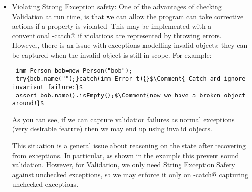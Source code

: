 \begin{itemize}
%
%

\item Violating Strong Exception safety:
One of the advantages of checking Validation at run time, is that
we can allow the program can take corrective actions if a property is violated.
This may be implemented with a conventional \Q@try-catch@ if violations are represented by throwing errors.
However, there is an issue with exceptions modelling invalid objects: they can be captured when the invalid object is still in scope. For example:
\saveSpace
\begin{lstlisting}
 imm Person bob=new Person("bob");
 try{bob.name("");}catch(imm Error t){}$\Comment{ Catch and ignore invariant failure:}$
 assert bob.name().isEmpty();$\Comment{now we have a broken object around!}$
\end{lstlisting}
\saveSpace
As you can see, if we can capture validation failures as normal exceptions (very desirable feature) then we may end up using invalid objects.

This situation is a general issue about reasoning on the state after recovering from exceptions.
In particular, as shown in the example this prevent sound validation.
However, for Validation, we only need String Exception Safety against unchecked exceptions, so we may enforce it only on \Q@try-catch@ capturing unchecked exceptions.


\end{itemize}
